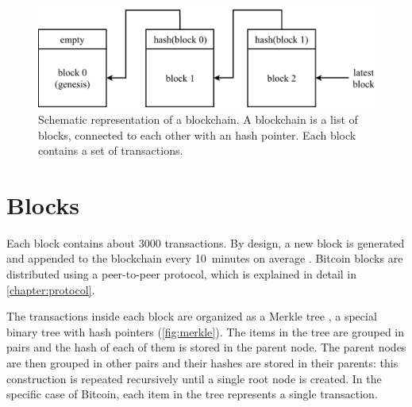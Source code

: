 \begin{figure}[ht]
	\centering
	\vspace*{0.25cm}
	\includegraphics[scale=0.7]{figures/blockchain}
	\vspace*{0.25cm}
	\caption[Schematic representation of a blockchain]{
		Schematic representation of a blockchain.
		A blockchain is a list of blocks, connected to each other with an hash pointer.
		Each block contains a set of transactions.
	}
	\label{fig:blockchain}
\end{figure}

\section{Blocks}
Each block contains about \num{3000} transactions.
By design, a new block is generated and appended to the blockchain every \SI{10}{minutes} on average \cite{bitcoin_2009}.
Bitcoin blocks are distributed using a peer-to-peer protocol, which is explained in detail in \cref{chapter:protocol}.

The transactions inside each block are organized as a Merkle tree \cite{merkle_tree_1980}, a special binary tree with hash pointers (\cref{fig:merkle}).
The items in the tree are grouped in pairs and the hash of each of them is stored in the parent node.
The parent nodes are then grouped in other pairs and their hashes are stored in their parents:
this construction is repeated recursively until a single root node is created.
In the specific case of Bitcoin, each item in the tree represents a single transaction.

